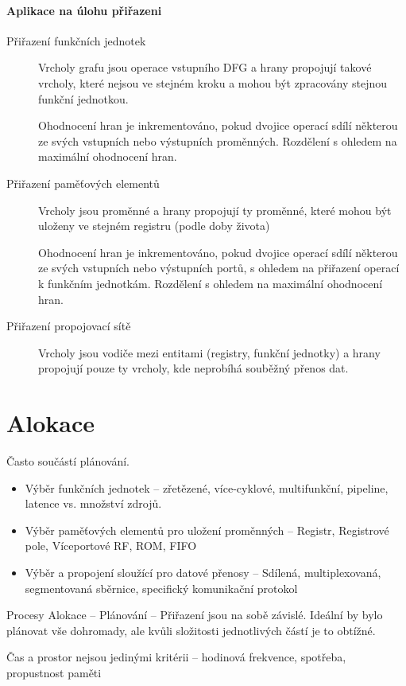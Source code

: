 \documentclass[a4paper, 11pt]{report}
\begin{document}
\paragraph{Aplikace na úlohu přiřazeni}
\begin{description}
	\item[Přiřazení funkčních jednotek] Vrcholy grafu jsou operace vstupního DFG a
	hrany propojují takové vrcholy, které nejsou ve stejném kroku a mohou být zpracovány stejnou funkční jednotkou.

	Ohodnocení hran je inkrementováno, pokud dvojice operací sdílí některou ze svých vstupních nebo výstupních proměnných. Rozdělení s ohledem na maximální ohodnocení hran.
	\item[Přiřazení paměťových elementů] Vrcholy jsou proměnné a
	hrany propojují ty proměnné, které mohou být uloženy ve stejném registru (podle doby života)

	Ohodnocení hran je inkrementováno, pokud dvojice operací sdílí některou ze svých vstupních nebo výstupních portů, s ohledem na přiřazení operací k funkčním jednotkám. Rozdělení s ohledem na maximální ohodnocení hran.
	\item[Přiřazení propojovací sítě] Vrcholy jsou vodiče mezi entitami (registry, funkční jednotky) a
	hrany propojují pouze ty vrcholy, kde neprobíhá souběžný přenos dat.
\end{description}

\section{Alokace}
Často součástí plánování.
\begin{itemize}
	\item Výběr funkčních jednotek -- zřetězené, více-cyklové, multifunkční, pipeline, latence vs. množství zdrojů.
	\item Výběr paměťových elementů pro uložení proměnných -- Registr, Registrové pole, Víceportové RF, ROM, FIFO
	\item Výběr a propojení sloužící pro datové přenosy -- Sdílená, multiplexovaná, segmentovaná sběrnice, specifický komunikační protokol
\end{itemize}

Procesy Alokace -- Plánování -- Přiřazení jsou na sobě závislé. Ideální by bylo plánovat vše dohromady, ale kvůli složitosti jednotlivých částí je to obtížné.

Čas a prostor nejsou jedinými kritérii -- hodinová frekvence, spotřeba, propustnost paměti
\end{document}
